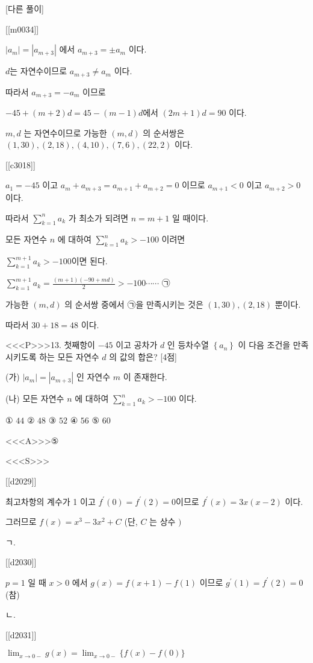 \documentclass{oblivoir}
\begin{document}
[다른 풀이]

[[m0034]]

$\left|a_{m}\right|=\left|a_{m+3}\right|$ 에서 $a_{m+3}=\pm a_{m}$ 이다.

$d$는 자연수이므로 $a_{m+3} \neq a_{m}$ 이다.

따라서 $a_{m+3}=-a_{m}$ 이므로

$-45+(m+2) d=45-(m-1) d$에서 $(2 m+1) d=90 $ 이다.

$m, d$ 는 자연수이므로 가능한 $(m, d)$ 의 순서쌍은 $(1,30),(2,18),(4,10),(7,6),(22,2)$ 이다.

[[c3018]]

$a_{1}=-45$ 이고 $a_{m}+a_{m+3}=a_{m+1}+a_{m+2}=0$ 이므로 $a_{m+1}<0$ 이고 $a_{m+2}>0$ 이다.

따라서 $\sum_{k=1}^{n} a_{k}$ 가 최소가 되려면 $n=m+1$ 일 때이다.

모든 자연수 $n$ 에 대하여 $\sum_{k=1}^{n} a_{k}>-100$ 이려면

$\sum_{k=1}^{m+1} a_{k}>-100 $이면 된다.

$\sum_{k=1}^{m+1} a_{k}=\frac{(m+1)(-90+m d)}{2}>-100 \cdots \cdots $ ㉠

가능한 $(m, d)$ 의 순서쌍 중에서  ㉠을 만족시키는 것은 $(1,30),(2,18)$ 뿐이다.

따라서 $30+18=48$ 이다.

<<<P>>>13. 첫째항이 $-45$ 이고 공차가 $d$ 인 등차수열 $\left\{a_{n}\right\}$ 이 다음 조건을 만족시키도록 하는 모든 자연수 $d$ 의 값의 합은? [4점]

(가) $\left|a_{m}\right|=\left|a_{m+3}\right|$ 인 자연수 $m$ 이 존재한다.

(나) 모든 자연수 $n$ 에 대하여 $\sum_{k=1}^{n} a_{k}>-100$ 이다.

① $44$
② $48$
③ $52$
④ $56$
⑤ $60$

<<<A>>>⑤

<<<S>>>

[[d2029]]

최고차항의 계수가 1 이고 $f^{\prime}(0)=f^{\prime}(2)=0$이므로 $f^{\prime}(x)=3 x(x-2)$ 이다.

그러므로 $f(x)=x^{3}-3 x^{2}+C$ (단, $C$ 는 상수 $)$

ㄱ.

[[d2030]]

$p=1$ 일 때 $x>0$ 에서 $g(x)=f(x+1)-f(1)$ 이므로 $g^{\prime}(1)=f^{\prime}(2)=0$ (참)

ㄴ.

[[d2031]]

$\lim _{x \rightarrow 0-} g(x)=\lim _{x \rightarrow 0-}\{f(x)-f(0)\}$
\end{document}
